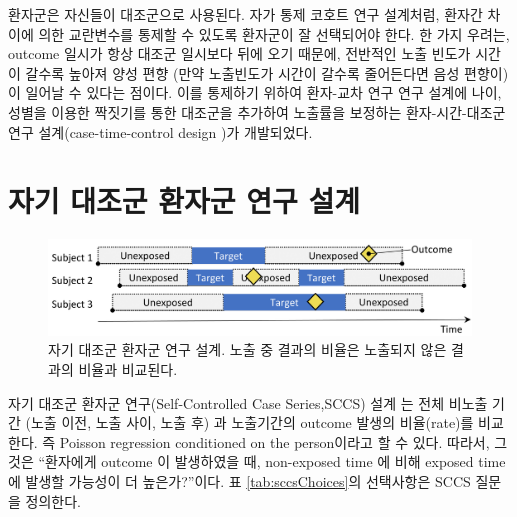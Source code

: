 \documentclass[11pt]{book}
\theoremstyle{definition}
\theoremstyle{definition}
\theoremstyle{definition}
\theoremstyle{remark}
\begin{document}
환자군은 자신들이 대조군으로 사용된다. 자가 통제 코호트 연구 설계처럼,
환자간 차이에 의한 교란변수를 통제할 수 있도록 환자군이 잘 선택되어야
한다. 한 가지 우려는, outcome 일시가 항상 대조군 일시보다 뒤에 오기
때문에, 전반적인 노출 빈도가 시간이 갈수록 높아져 양성 편향 (만약
노출빈도가 시간이 갈수록 줄어든다면 음성 편향이) 이 일어날 수 있다는
점이다. 이를 통제하기 위하여 환자-교차 연구 연구 설계에 나이, 성별을
이용한 짝짓기를 통한 대조군을 추가하여 노출률을 보정하는
환자-시간-대조군 연구 설계(case-time-control design
\citep{suissa_1995})가 개발되었다. 

\section{자기 대조군 환자군 연구 설계}\label{----}


\begin{figure}[h]

{\centering \includegraphics[width=0.9\linewidth]{images/PopulationLevelEstimation/selfControlledCaseSeries} 

}

\caption{자기 대조군 환자군 연구 설계. 노출 중 결과의 비율은 노출되지 않은 결과의 비율과 비교된다.}\label{fig:selfControlledCaseSeries}
\end{figure}

자기 대조군 환자군 연구(Self-Controlled Case Series,SCCS) 설계
\citep{farrington_1995, whitaker_2006}는 전체 비노출 기간 (노출 이전,
노출 사이, 노출 후) 과 노출기간의 outcome 발생의 비율(rate)를 비교한다.
즉 Poisson regression conditioned on the person이라고 할 수 있다.
따라서, 그것은 ``환자에게 outcome 이 발생하였을 때, non-exposed time 에
비해 exposed time 에 발생할 가능성이 더 높은가?''이다. 표
\ref{tab:sccsChoices}의 선택사항은 SCCS 질문을 정의한다.
 
\end{document}
